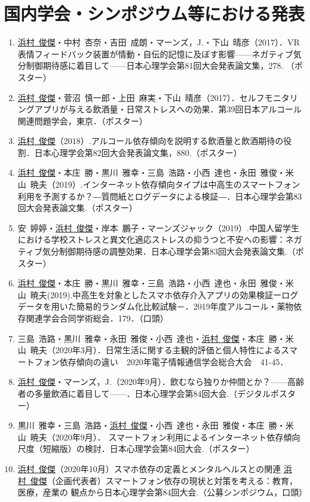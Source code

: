 \documentclass[11pt,a4paper]{article}
\begin{document}
\section{国内学会・シンポジウム等における発表}
\begin{enumerate}
	\item \underline{浜村\ 俊傑}・中村\ 杏奈・吉田\ 成朗・マーンズ，J.・下山\ 晴彦（2017）．VR表情フィードバック装置が情動・自伝的記憶に及ぼす影響——ネガティブ気分制御期待感に着目して——日本心理学会第81回大会発表論文集，278. （ポスター）
	\item \underline{浜村\ 俊傑}・菅沼\ 慎一郎・上田\ 麻実・下山\ 晴彦（2017）．セルフモニタリングアプリが与える飲酒量・日常ストレスへの効果．第39回日本アルコール関連問題学会，東京．（ポスター）
	\item \underline{浜村\ 俊傑}（2018）.アルコール依存傾向を説明する飲酒量と飲酒期待の役割．日本心理学会第82回大会発表論文集，880.（ポスター）
	\item \underline{浜村\ 俊傑}・本庄\ 勝・黒川\ 雅幸・三島\ 浩路・小西\ 達也・永田\ 雅俊・米山\ 暁夫（2019）.インターネット依存傾向タイプは中高生のスマートフォン利用を予測するか？―質問紙とログデータによる検証―．日本心理学会第83回大会発表論文集.（ポスター）
	\item 安\ 婷婷・\underline{浜村\ 俊傑}・岸本\ 鵬子・マーンズジャック（2019）.中国人留学生における学校ストレスと異文化適応ストレスの抑うつと不安への影響：ネガティブ気分制御期待感の調整効果．日本心理学会第83回大会発表論文集.（ポスター）
	\item\underline{浜村\ 俊傑}・本庄\ 勝・黒川\ 雅幸・三島\ 浩路・小西\ 達也・永田\ 雅俊・米山\ 暁夫(2019).中高生を対象としたスマホ依存介入アプリの効果検証ーログデータを用いた簡易的ランダム化比較試験－．2019年度アルコール・薬物依存関連学会合同学術総会．179．（口頭）
	\item 三島\ 浩路・黒川\ 雅幸・永田\ 雅俊・小西\ 達也・\underline{浜村\ 俊傑}・本庄\ 勝・米山\ 暁夫（2020年3月）．日常生活に関する主観的評価と個人特性によるスマートフォン依存傾向の違い　2020年電子情報通信学会総合大会　41-45．　
	\item \underline{浜村\ 俊傑}・マーンズ，J.（2020年9月）．飲むなら独りか仲間とか？——高齢者の多量飲酒に着目して——．日本心理学会第84回大会.（デジタルポスター）
	\item 黒川\ 雅幸・三島\ 浩路・\underline{浜村\ 俊傑}・小西\ 達也・永田\ 雅俊・本庄\ 勝・米山\ 暁夫（2020年9月）．	スマートフォン利用によるインターネット依存傾向尺度（短縮版）の検討．日本心理学会第84回大会.（ポスター）
	\item \underline{浜村\ 俊傑}（2020年10月）スマホ依存の定義とメンタルヘルスとの関連	\underline{浜村\ 俊傑}（企画代表者）スマートフォン依存の現状と対策を考える：教育，医療，産業の	観点から日本心理学会第84回大会.（公募シンポジウム，口頭）

\end{enumerate}
\end{document}
